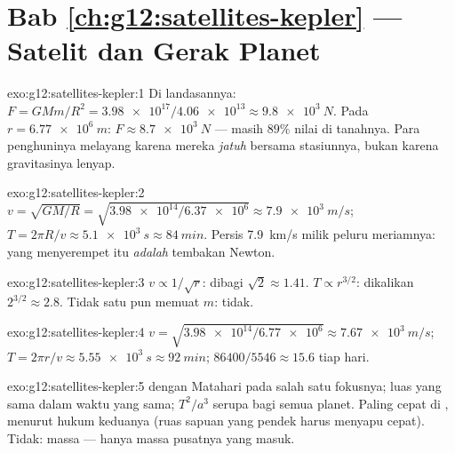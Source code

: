 \section*{Bab \ref{ch:g12:satellites-kepler} --- Satelit dan Gerak Planet}

\begin{solution}{exo:g12:satellites-kepler:1}
Di landasannya: $F = GMm/R^2 = \num{3.98e17}/\num{4.06e13} \approx
\qty{9.8e3}{N}$. Pada $r = \qty{6.77e6}{m}$:
$F \approx \qty{8.7e3}{N}$ --- masih $89\%$ nilai di tanahnya. Para
penghuninya melayang karena mereka \emph{jatuh} bersama stasiunnya,
bukan karena gravitasinya lenyap.
\end{solution}

\begin{solution}{exo:g12:satellites-kepler:2}
$v = \sqrt{GM/R} = \sqrt{\num{3.98e14}/\num{6.37e6}} \approx
\qty{7.9e3}{m/s}$; $T = 2\pi R/v \approx \qty{5.1e3}{s} \approx
\qty{84}{min}$. Persis \qty{7.9}{km/s} milik peluru meriamnya: 
yang menyerempet itu \emph{adalah} tembakan Newton.
\end{solution}

\begin{solution}{exo:g12:satellites-kepler:3}
$v \propto 1/\sqrt{r}$: dibagi $\sqrt 2 \approx 1.41$.
$T \propto r^{3/2}$: dikalikan $2^{3/2} \approx 2.8$. Tidak satu pun
memuat $m$: tidak.
\end{solution}

\begin{solution}{exo:g12:satellites-kepler:4}
$v = \sqrt{\num{3.98e14}/\num{6.77e6}} \approx \qty{7.67e3}{m/s}$;
$T = 2\pi r/v \approx \qty{5.55e3}{s} \approx \qty{92}{min}$;
$\num{86400}/5546 \approx 15.6$  tiap hari.
\end{solution}

\begin{solution}{exo:g12:satellites-kepler:5}
 dengan Matahari pada salah satu fokusnya; luas yang sama dalam waktu
yang sama; $T^2/a^3$ serupa bagi semua planet. Paling cepat di ,
menurut hukum keduanya (ruas sapuan yang pendek harus menyapu cepat). Tidak:
massa   --- hanya massa pusatnya yang masuk.
\end{solution}

